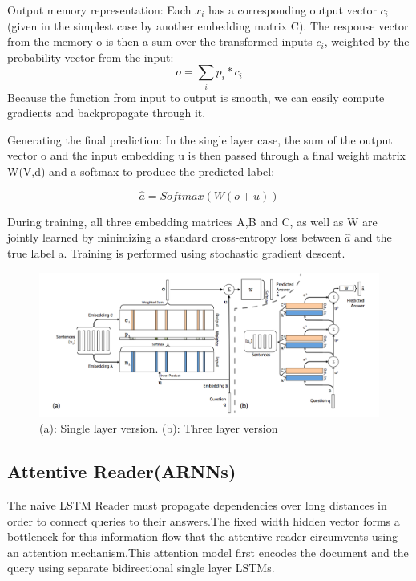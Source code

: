 \documentclass{article}
\begin{document}
Output  memory  representation: Each $x_i$ has  a  corresponding  output  vector
$c_i$ (given  in  the simplest case by another embedding matrix C). The response vector from the memory o is then a sum over the transformed inputs $c_i$, weighted by the probability vector from the input:
\begin{equation}
o = \sum_i p_i * c_i
\end{equation}
Because the function from input to output is smooth, we can easily compute gradients and backpropagate through it.

Generating the final prediction: In the single layer case, the sum of the output vector o and the input embedding u is then passed through a final weight matrix W(V,d) and a softmax to produce the predicted label:

\begin{equation}
\hat{a} = Softmax(W (o + u))
\end{equation}

During training, all three embedding matrices A,B and C, as well as W are jointly learned by minimizing a standard cross-entropy loss between $\hat{a}$ and the true label a. Training is performed using stochastic gradient descent.

\begin{figure}
  \includegraphics[width=\linewidth]{memory.png}
  \caption{ (a): Single layer version. (b): Three layer version }
  \label{fig:memory}
\end{figure}

\subsection{Attentive Reader(ARNNs)}

The naive LSTM Reader must propagate dependencies over long distances in order to connect queries to their answers.The fixed width hidden vector forms a bottleneck for this information flow that the attentive reader circumvents using an attention mechanism.This attention model first encodes the document and the query using separate bidirectional single layer LSTMs.
\end{document}

